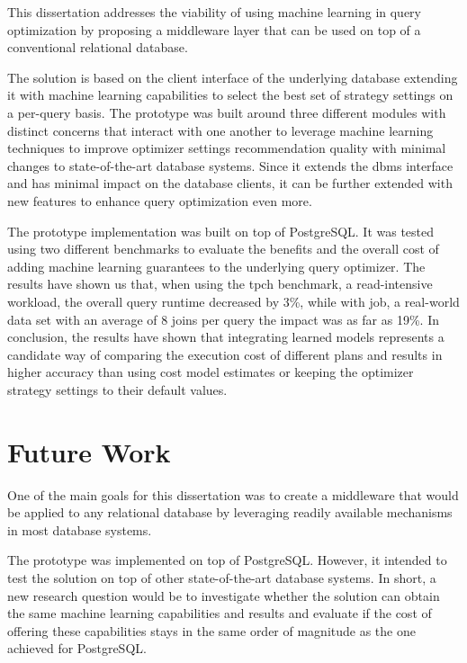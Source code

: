 This dissertation addresses the viability of using machine learning in query optimization by proposing a middleware layer that can be used on top of a conventional relational database.

The solution is based on the client interface of the underlying database extending it with machine learning capabilities to select the best set of strategy settings on a per-query basis. The prototype was built around three different modules with distinct concerns that interact with one another to leverage machine learning techniques to improve optimizer settings recommendation quality with minimal changes to state-of-the-art database systems. Since it extends the \gls{dbms} interface and has minimal impact on the database clients, it can be further extended with new features to enhance query optimization even more.

The prototype implementation was built on top of PostgreSQL. It was tested using two different benchmarks to evaluate the benefits and the overall cost of adding machine learning guarantees to the underlying query optimizer. The results have shown us that, when using the \gls{tpch} benchmark, a read-intensive workload, the overall query runtime decreased by 3\%, while with \gls{job}, a real-world data set with an average of 8 joins per query the impact was as far as 19\%. In conclusion, the results have shown that integrating learned models represents a candidate way of comparing the execution cost of different plans and results in higher accuracy than using cost model estimates or keeping the optimizer strategy settings to their default values.

\section{Future Work}

One of the main goals for this dissertation was to create a middleware that would be applied to any relational database by leveraging readily available mechanisms in most database systems.

The prototype was implemented on top of PostgreSQL. However, it intended to test the solution on top of other state-of-the-art database systems. In short, a new research question would be to investigate whether the solution can obtain the same machine learning capabilities and results and evaluate if the cost of offering these capabilities stays in the same order of magnitude as the one achieved for PostgreSQL.

